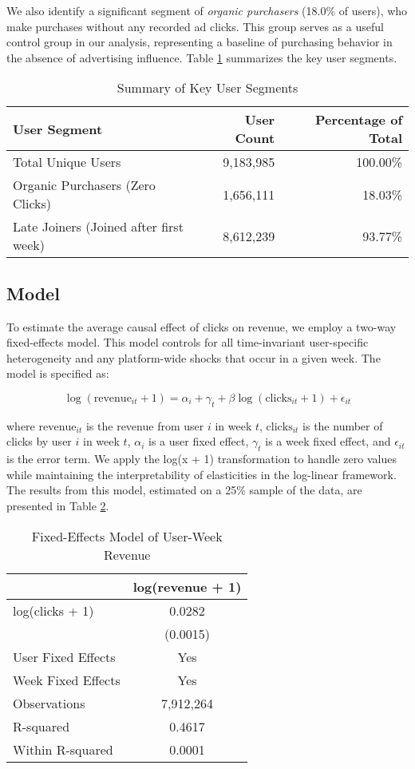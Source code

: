 We also identify a significant segment of \textit{organic purchasers} (18.0\% of users), who make purchases without any recorded ad clicks. This group serves as a useful control group in our analysis, representing a baseline of purchasing behavior in the absence of advertising influence. Table \ref{tab:user_segments} summarizes the key user segments.

\begin{table}[htbp!]
\centering
\caption{Summary of Key User Segments}
\label{tab:user_segments}
\begin{tabular}{lrr}
\toprule
User Segment & User Count & Percentage of Total \\
\midrule
Total Unique Users & 9,183,985 & 100.00\% \\
Organic Purchasers (Zero Clicks) & 1,656,111 & 18.03\% \\
Late Joiners (Joined after first week) & 8,612,239 & 93.77\% \\
\bottomrule
\end{tabular}
\end{table}

\subsection*{Model}

To estimate the average causal effect of clicks on revenue, we employ a two-way fixed-effects model. This model controls for all time-invariant user-specific heterogeneity and any platform-wide shocks that occur in a given week. The model is specified as:

\begin{equation}
\log(\text{revenue}_{it} + 1) = \alpha_i + \gamma_t + \beta \log(\text{clicks}_{it} + 1) + \epsilon_{it}
\end{equation}

where $\text{revenue}_{it}$ is the revenue from user $i$ in week $t$, $\text{clicks}_{it}$ is the number of clicks by user $i$ in week $t$, $\alpha_i$ is a user fixed effect, $\gamma_t$ is a week fixed effect, and $\epsilon_{it}$ is the error term. We apply the log(x + 1) transformation to handle zero values while maintaining the interpretability of elasticities in the log-linear framework. The results from this model, estimated on a 25\% sample of the data, are presented in Table \ref{tab:user_fe_results}.

\begin{table}[htbp!]
\centering
\caption{Fixed-Effects Model of User-Week Revenue}
\label{tab:user_fe_results}
\begin{tabular}{lc}
\toprule
 & log(revenue + 1) \\
\midrule
log(clicks + 1) & 0.0282 \\
 & (0.0015) \\
\midrule
User Fixed Effects & Yes \\
Week Fixed Effects & Yes \\
Observations & 7,912,264 \\
R-squared & 0.4617 \\
Within R-squared & 0.0001 \\
\bottomrule
\end{tabular}
\end{table}

